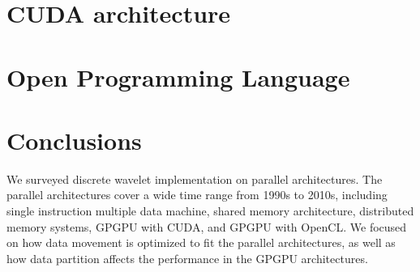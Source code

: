 \documentclass{article}
\begin{document}
\section{CUDA architecture}
\label{sec:cuda}


\section{Open Programming Language}
\label{sec:opencl}


\section{Conclusions}
\label{sec:conclusion}
%
We surveyed discrete wavelet implementation on parallel architectures.
%
The parallel architectures cover a wide time range from 1990s to 2010s,
including single instruction multiple data machine, shared memory architecture, 
distributed memory systems, GPGPU with CUDA, and GPGPU with OpenCL. 
%
We focused on how data movement is optimized to fit the parallel architectures,
as well as how data partition affects the performance in the GPGPU architectures.

 
%

\end{document}
